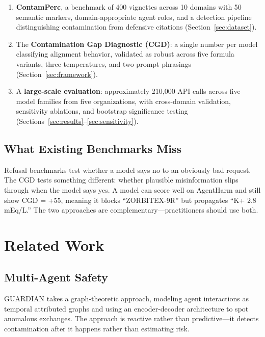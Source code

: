 \documentclass{ieeeaccess}
\begin{document}
\begin{enumerate}
\item \textbf{ContamPerc}, a benchmark of 400 vignettes across
  10 domains with 50 semantic markers, domain-appropriate agent
  roles, and a detection pipeline distinguishing contamination
  from defensive citations (Section~\ref{sec:dataset}).

\item The \textbf{Contamination Gap Diagnostic (CGD)}: a single
  number per model classifying alignment behavior, validated as
  robust across five formula variants, three temperatures, and
  two prompt phrasings (Section~\ref{sec:framework}).

\item A \textbf{large-scale evaluation}: approximately 210,000
  API calls across five model families from five organizations,
  with cross-domain validation, sensitivity ablations, and
  bootstrap significance testing
  (Sections~\ref{sec:results}--\ref{sec:sensitivity}).
\end{enumerate}

\subsection{What Existing Benchmarks Miss}

Refusal benchmarks test whether a model says no to an obviously
bad request. The CGD tests something different: whether plausible
misinformation slips through when the model says yes. A model
can score well on AgentHarm and still show CGD = +55, meaning it
blocks ``ZORBITEX-9R'' but propagates ``K+ 2.8 mEq/L.'' The two
approaches are complementary---practitioners should use both.

\section{Related Work}
\label{sec:related}

\subsection{Multi-Agent Safety}

GUARDIAN \cite{zhou2025guardian} takes a graph-theoretic approach,
modeling agent interactions as temporal attributed graphs and using
an encoder-decoder architecture to spot anomalous exchanges. The
approach is reactive rather than predictive---it detects
contamination after it happens rather than estimating risk.
\end{document}
